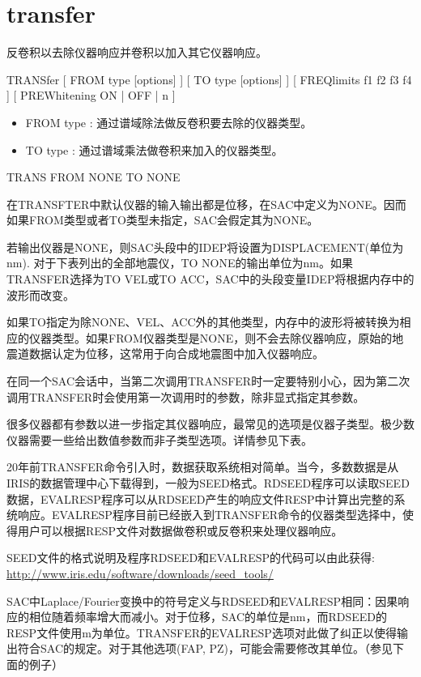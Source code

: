 \section{transfer}
\label{cmd:transfer}

反卷积以去除仪器响应并卷积以加入其它仪器响应。

TRANSfer [ FROM type [options] ] [ TO type [options] ] [ FREQlimits f1 f2 f3 f4 ] [ PREWhitening ON | OFF | n ]

\begin{itemize}
\item FROM type : 通过谱域除法做反卷积要去除的仪器类型。 
\item TO type : 通过谱域乘法做卷积来加入的仪器类型。 
\end{itemize}

TRANS FROM NONE TO NONE

在TRANSFTER中默认仪器的输入输出都是位移，在SAC中定义为NONE。因而如果FROM类型或者TO类型未指定，SAC会假定其为NONE。

若输出仪器是NONE，则SAC头段中的IDEP将设置为DISPLACEMENT(单位为nm). 对于下表列出的全部地震仪，TO NONE的输出单位为nm。如果TRANSFER选择为TO VEL或TO ACC，SAC中的头段变量IDEP将根据内存中的波形而改变。

如果TO指定为除NONE、VEL、ACC外的其他类型，内存中的波形将被转换为相应的仪器类型。如果FROM仪器类型是NONE，则不会去除仪器响应，原始的地震道数据认定为位移，这常用于向合成地震图中加入仪器响应。

在同一个SAC会话中，当第二次调用TRANSFER时一定要特别小心，因为第二次调用TRANSFER时会使用第一次调用时的参数，除非显式指定其参数。

很多仪器都有参数以进一步指定其仪器响应，最常见的选项是仪器子类型。极少数仪器需要一些给出数值参数而非子类型选项。详情参见下表。

20年前TRANSFER命令引入时，数据获取系统相对简单。当今，多数数据是从IRIS的数据管理中心下载得到，一般为SEED格式。RDSEED程序可以读取SEED数据，EVALRESP程序可以从RDSEED产生的响应文件RESP中计算出完整的系统响应。EVALRESP程序目前已经嵌入到TRANSFER命令的仪器类型选择中，使得用户可以根据RESP文件对数据做卷积或反卷积来处理仪器响应。

SEED文件的格式说明及程序RDSEED和EVALRESP的代码可以由此获得:\\
\href{http://www.iris.edu/software/downloads/seed_tools/}{http://www.iris.edu/software/downloads/seed\_tools/}

SAC中Laplace/Fourier变换中的符号定义与RDSEED和EVALRESP相同：因果响应的相位随着频率增大而减小。对于位移，SAC的单位是nm，而RDSEED的RESP文件使用m为单位。TRANSFER的EVALRESP选项对此做了纠正以使得输出符合SAC的规定。对于其他选项(FAP, PZ)，可能会需要修改其单位。（参见下面的例子）

